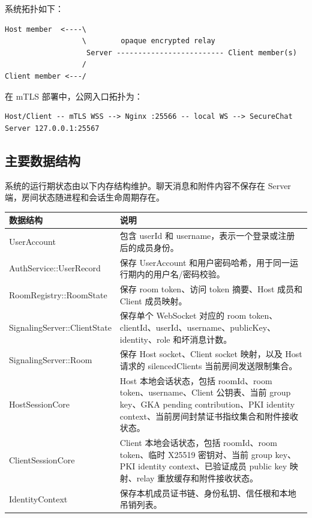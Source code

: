 \documentclass[UTF8,a4paper,12pt]{ctexart}
\begin{document}
系统拓扑如下：

\begin{verbatim}
Host member  <----\
                  \        opaque encrypted relay
                   Server ------------------------- Client member(s)
                  /
Client member <---/
\end{verbatim}

在 mTLS 部署中，公网入口拓扑为：

\begin{verbatim}
Host/Client -- mTLS WSS --> Nginx :25566 -- local WS --> SecureChat Server 127.0.0.1:25567
\end{verbatim}

\subsection{主要数据结构}

系统的运行期状态由以下内存结构维护。聊天消息和附件内容不保存在 Server 端，房间状态随进程和会话生命周期存在。

\begin{longtable}{p{4cm}p{10cm}}
\toprule
数据结构 & 说明 \\
\midrule
UserAccount & 包含 userId 和 username，表示一个登录或注册后的成员身份。\\
AuthService::UserRecord & 保存 UserAccount 和用户密码哈希，用于同一运行期内的用户名/密码校验。\\
RoomRegistry::RoomState & 保存 room token、访问 token 摘要、Host 成员和 Client 成员映射。\\
SignalingServer::ClientState & 保存单个 WebSocket 对应的 room token、clientId、userId、username、publicKey、identity、role 和坏消息计数。\\
SignalingServer::Room & 保存 Host socket、Client socket 映射，以及 Host 请求的 silencedClients 当前房间发送限制集合。\\
HostSessionCore & Host 本地会话状态，包括 roomId、room token、username、Client 公钥表、当前 group key、GKA pending contribution、PKI identity context、当前房间封禁证书指纹集合和附件接收状态。\\
ClientSessionCore & Client 本地会话状态，包括 roomId、room token、临时 X25519 密钥对、当前 group key、PKI identity context、已验证成员 public key 映射、relay 重放缓存和附件接收状态。\\
IdentityContext & 保存本机成员证书链、身份私钥、信任根和本地吊销列表。\\
\bottomrule
\end{longtable}
\end{document}
